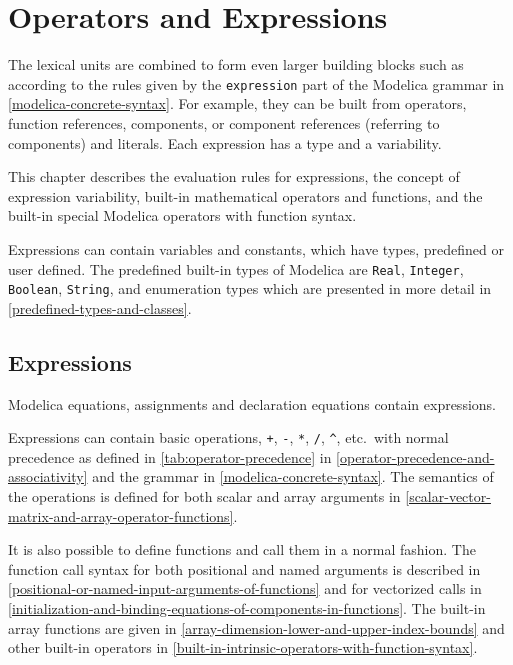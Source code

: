 \chapter{Operators and Expressions}\label{operators-and-expressions}

The lexical units are combined to form even larger building blocks such as  according to the rules given by the \lstinline[language=grammar]!expression! part of the Modelica grammar in \cref{modelica-concrete-syntax}.
For example, they can be built from operators, function references, components, or component references (referring to components) and literals.
Each expression has a type and a variability.

This chapter describes the evaluation rules for expressions, the concept of expression variability, built-in mathematical operators and functions, and the built-in special Modelica operators with function syntax.

Expressions can contain variables and constants, which have types, predefined or user defined.
The predefined built-in types of Modelica are \lstinline!Real!, \lstinline!Integer!, \lstinline!Boolean!, \lstinline!String!, and enumeration types which are presented in more detail in \cref{predefined-types-and-classes}.


\section{Expressions}\label{expressions}

Modelica equations, assignments and declaration equations contain expressions.

Expressions can contain basic operations, \lstinline!+!, \lstinline!-!, \lstinline!*!, \lstinline!/!, \lstinline!^!, etc.\ with normal precedence as defined in \cref{tab:operator-precedence} in \cref{operator-precedence-and-associativity} and the grammar in \cref{modelica-concrete-syntax}.
The semantics of the operations is defined for both scalar and array arguments in \cref{scalar-vector-matrix-and-array-operator-functions}.

It is also possible to define functions and call them in a normal fashion.
The function call syntax for both positional and named arguments is described in \cref{positional-or-named-input-arguments-of-functions} and for vectorized calls in \cref{initialization-and-binding-equations-of-components-in-functions}.
The built-in array functions are given in \cref{array-dimension-lower-and-upper-index-bounds} and other built-in operators in \cref{built-in-intrinsic-operators-with-function-syntax}.


